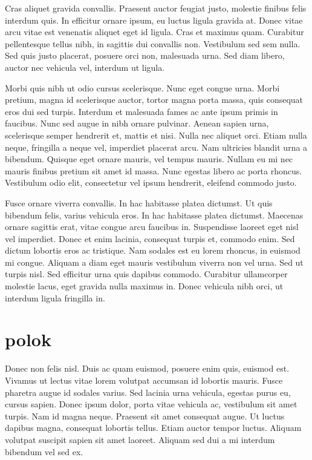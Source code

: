 \documentclass[10pt,a4paper]{article}
\begin{document}
Cras aliquet gravida convallis. Praesent auctor feugiat justo, molestie finibus felis interdum quis. In efficitur ornare ipsum, eu luctus ligula gravida at. Donec vitae arcu vitae est venenatis aliquet eget id ligula. Cras et maximus quam. Curabitur pellentesque tellus nibh, in sagittis dui convallis non. Vestibulum sed sem nulla. Sed quis justo placerat, posuere orci non, malesuada urna. Sed diam libero, auctor nec vehicula vel, interdum ut ligula.

Morbi quis nibh ut odio cursus scelerisque. Nunc eget congue urna. Morbi pretium, magna id scelerisque auctor, tortor magna porta massa, quis consequat eros dui sed turpis. Interdum et malesuada fames ac ante ipsum primis in faucibus. Nunc sed augue in nibh ornare pulvinar. Aenean sapien urna, scelerisque semper hendrerit et, mattis et nisi. Nulla nec aliquet orci. Etiam nulla neque, fringilla a neque vel, imperdiet placerat arcu. Nam ultricies blandit urna a bibendum. Quisque eget ornare mauris, vel tempus mauris. Nullam eu mi nec mauris finibus pretium sit amet id massa. Nunc egestas libero ac porta rhoncus. Vestibulum odio elit, consectetur vel ipsum hendrerit, eleifend commodo justo.

Fusce ornare viverra convallis. In hac habitasse platea dictumst. Ut quis bibendum felis, varius vehicula eros. In hac habitasse platea dictumst. Maecenas ornare sagittis erat, vitae congue arcu faucibus in. Suspendisse laoreet eget nisl vel imperdiet. Donec et enim lacinia, consequat turpis et, commodo enim. Sed dictum lobortis eros ac tristique. Nam sodales est eu lorem rhoncus, in euismod mi congue. Aliquam a diam eget mauris vestibulum viverra non vel urna. Sed ut turpis nisl. Sed efficitur urna quis dapibus commodo. Curabitur ullamcorper molestie lacus, eget gravida nulla maximus in. Donec vehicula nibh orci, ut interdum ligula fringilla in.

\section{polok}

Donec non felis nisl. Duis ac quam euismod, posuere enim quis, euismod est. Vivamus ut lectus vitae lorem volutpat accumsan id lobortis mauris. Fusce pharetra augue id sodales varius. Sed lacinia urna vehicula, egestas purus eu, cursus sapien. Donec ipsum dolor, porta vitae vehicula ac, vestibulum sit amet turpis. Nam id magna neque. Praesent sit amet consequat augue. Ut luctus dapibus magna, consequat lobortis tellus. Etiam auctor tempor luctus. Aliquam volutpat suscipit sapien sit amet laoreet. Aliquam sed dui a mi interdum bibendum vel sed ex.
\end{document}
